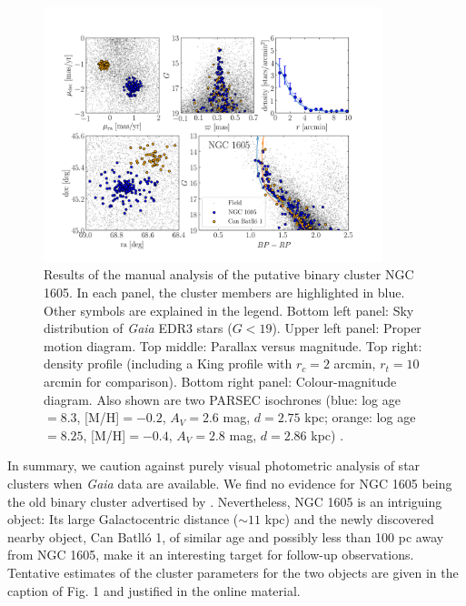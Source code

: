 \documentclass[RNAAS]{aastex631}
\begin{document}
\begin{figure}
\begin{center}
\includegraphics[width=0.88\textwidth,angle=0]{../im/ngc1605_manual_analysis.png}
\caption{Results of the manual analysis of the putative binary cluster NGC 1605. In each panel, the cluster members are highlighted in blue. Other symbols are explained in the legend. Bottom left panel: Sky distribution of {\it Gaia} EDR3 stars ($G<19$). Upper left panel: Proper motion diagram. Top middle: Parallax versus magnitude. Top right: density profile (including a King profile with $r_c=2$ arcmin, $r_t=10$ arcmin for comparison). Bottom right panel: Colour-magnitude diagram. Also shown are two PARSEC isochrones (blue: log age $=8.3$, [M/H]$=-0.2$, $A_V=2.6$ mag, $d=2.75$ kpc; orange: log age $=8.25$, [M/H]$=-0.4$, $A_V=2.8$ mag, $d=2.86$ kpc) . 
\label{fig:1}}
\end{center}
\end{figure}

In summary, we caution against purely visual photometric analysis of star clusters when {\it Gaia} data are available. We find no evidence for NGC 1605 being the old binary cluster advertised by \citet{Camargo2021}. Nevertheless, NGC 1605 is an intriguing object: Its large Galactocentric distance ($\sim 11$ kpc) and the newly discovered nearby object, Can Batlló 1, of similar age and possibly less than 100 pc away from NGC 1605, make it an interesting target for follow-up observations. Tentative estimates of the cluster parameters for the two objects are given in the caption of Fig. 1 and justified in the online material.




{}

\end{document}

